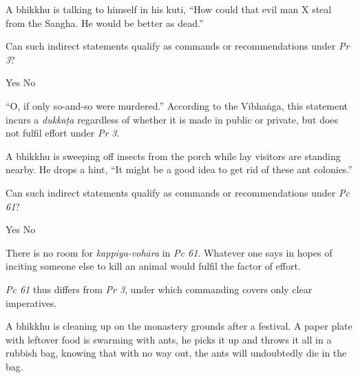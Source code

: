 \begin{exam}{\autoExamName}
\begin{problem}
  A bhikkhu is talking to himself in his kuti, ``How could that evil man X steal from the Sangha. He would be better as dead.''

  Can such indirect statements qualify as commands or recommendations under \emph{Pr 3}?

  \bigskip

  \begin{answers}{2}
    \bChoices
     Yes\eAns
     No\eAns
    \eChoices
  \end{answers}

  \begin{solution}
    ``O, if only so-and-so were murdered.'' According to the Vibhaṅga, this statement incurs a \emph{dukkaṭa} regardless of whether it is made in public or private, but does not fulfil effort under \emph{Pr 3}.
  \end{solution}

\end{problem}

\problemDivide

\begin{problem}

  A bhikkhu is sweeping off insects from the porch while lay visitors are standing nearby.
  He drops a hint, ``It might be a good idea to get rid of these ant colonies.''

  Can such indirect statements qualify as commands or recommendations under \emph{Pc 61}?

  \bigskip

  \begin{answers}{2}
    \bChoices
     Yes\eAns
     No\eAns
    \eChoices
  \end{answers}

  \begin{solution}
    There is no room for \emph{kappiya-vohāra} in \emph{Pc 61}. Whatever one says in hopes of inciting someone else to kill an animal would fulfil the factor of effort.

    \emph{Pc 61} thus differs from \emph{Pr 3}, under which commanding covers only clear imperatives.
  \end{solution}

\end{problem}

\ifnosolutions
\clearpage
\else
\problemDivide
\fi

\begin{problem}

  A bhikkhu is cleaning up on the monastery grounds after a festival.
  A paper plate with leftover food is swarming with ants, he picks it up and throws it all in a rubbish bag,
  knowing that with no way out, the ants will undoubtedly die in the bag.


\end{problem}
\end{exam}
